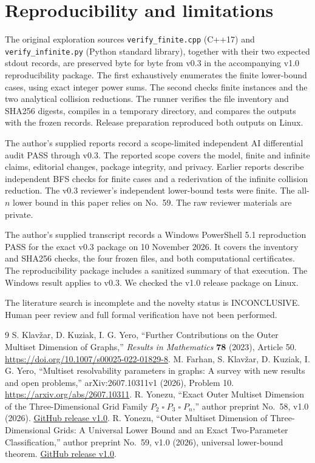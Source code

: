 \documentclass[10pt,a4paper]{article}
\newcommand{\sq}{\mathbin{\square}}
\begin{document}
\section{Reproducibility and limitations}
The original exploration sources \texttt{verify\_finite.cpp} (C++17)
and \texttt{verify\_infinite.py} (Python standard library), together with
their two expected stdout records, are preserved byte for byte from
v0.3 in the accompanying v1.0 reproducibility package. The first
exhaustively enumerates the finite lower-bound cases, using exact integer
power sums. The second checks finite instances and the two analytical
collision reductions. The runner verifies the file inventory and SHA256
digests, compiles in a temporary directory, and compares the outputs with
the frozen records. Release preparation reproduced both outputs on Linux.

The author's supplied reports record a scope-limited independent AI
differential audit PASS through v0.3. The reported scope covers the model,
finite and infinite claims, editorial changes, package integrity, and privacy.
Earlier reports describe independent BFS checks for finite cases and a
rederivation of the infinite collision reduction. The v0.3 reviewer's
independent lower-bound tests were finite. The all-$n$ lower bound in this
paper relies on No.~59. The raw reviewer materials are private.

The author's supplied transcript records a Windows PowerShell 5.1
reproduction PASS for the exact v0.3 package on 10 November 2026.
It covers the inventory and SHA256 checks, the four frozen files, and
both computational certificates. The reproducibility package includes a
sanitized summary of that execution. The Windows result applies to v0.3.
We checked the v1.0 release package on Linux.

The literature search is incomplete and the novelty status is INCONCLUSIVE.
Human peer review and full formal verification have not been performed.

\begin{thebibliography}{9}\small
{}
S. Klav\v{z}ar, D. Kuziak, I. G. Yero,
``Further Contributions on the Outer Multiset Dimension of Graphs,''
\emph{Results in Mathematics} \textbf{78} (2023), Article 50.
\url{https://doi.org/10.1007/s00025-022-01829-8}.
M. Farhan, S. Klav\v{z}ar, D. Kuziak, I. G. Yero,
``Multiset resolvability parameters in graphs: A survey with new results
and open problems,'' arXiv:2607.10311v1 (2026), Problem 10.
\url{https://arxiv.org/abs/2607.10311}.
R. Yonezu, ``Exact Outer Multiset Dimension of the Three-Dimensional
Grid Family $P_2\sq P_3\sq P_n$,'' author preprint No.~58, v1.0 (2026).
\href{https://github.com/yonezaemon1-hub/no58-outer-multiset-dimension-3d-grid/releases/tag/v1.0}{GitHub release v1.0}.
R. Yonezu, ``Outer Multiset Dimension of Three-Dimensional Grids:
A Universal Lower Bound and an Exact Two-Parameter Classification,''
author preprint No.~59, v1.0 (2026), universal lower-bound theorem.
\href{https://github.com/yonezaemon1-hub/no59-outer-multiset-dimension-3d-grid-classification/releases/tag/v1.0}{GitHub release v1.0}.
\end{thebibliography}
\end{document}
